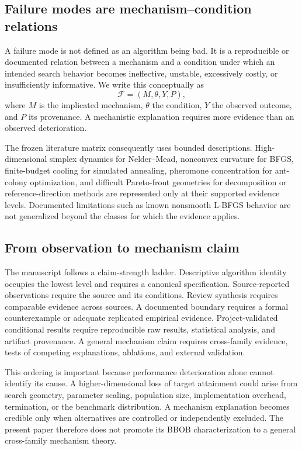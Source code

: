 \subsection{Failure modes are mechanism--condition relations}

A failure mode is not defined as an algorithm being bad. It is a reproducible or documented relation between a mechanism and a condition under which an intended search behavior becomes ineffective, unstable, excessively costly, or insufficiently informative. We write this conceptually as
\begin{equation}
\mathcal{F}=\left(M,\theta,Y,P\right),
\end{equation}
where \(M\) is the implicated mechanism, \(\theta\) the condition, \(Y\) the observed outcome, and \(P\) its provenance. A mechanistic explanation requires more evidence than an observed deterioration.

The frozen literature matrix consequently uses bounded descriptions. High-dimensional simplex dynamics for Nelder--Mead, nonconvex curvature for BFGS, finite-budget cooling for simulated annealing, pheromone concentration for ant-colony optimization, and difficult Pareto-front geometries for decomposition or reference-direction methods are represented only at their supported evidence levels. Documented limitations such as known nonsmooth L-BFGS behavior are not generalized beyond the classes for which the evidence applies.

\subsection{From observation to mechanism claim}

The manuscript follows a claim-strength ladder. Descriptive algorithm identity occupies the lowest level and requires a canonical specification. Source-reported observations require the source and its conditions. Review synthesis requires comparable evidence across sources. A documented boundary requires a formal counterexample or adequate replicated empirical evidence. Project-validated conditional results require reproducible raw results, statistical analysis, and artifact provenance. A general mechanism claim requires cross-family evidence, tests of competing explanations, ablations, and external validation.

This ordering is important because performance deterioration alone cannot identify its cause. A higher-dimensional loss of target attainment could arise from search geometry, parameter scaling, population size, implementation overhead, termination, or the benchmark distribution. A mechanism explanation becomes credible only when alternatives are controlled or independently excluded. The present paper therefore does not promote its BBOB characterization to a general cross-family mechanism theory.


